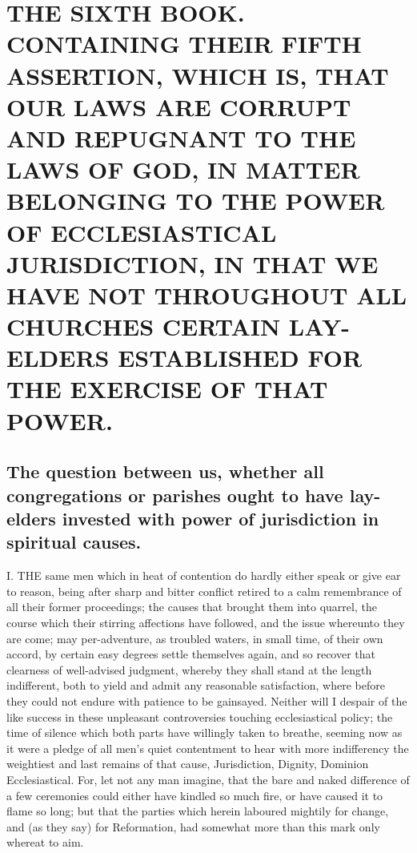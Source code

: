 \chapter*[The Sixth Book]{THE SIXTH BOOK. 
CONTAINING THEIR FIFTH ASSERTION, WHICH IS, THAT OUR LAWS ARE CORRUPT AND REPUGNANT TO THE LAWS OF GOD, IN MATTER BELONGING TO THE POWER OF ECCLESIASTICAL JURISDICTION, IN THAT WE HAVE NOT THROUGHOUT ALL CHURCHES CERTAIN LAY-ELDERS ESTABLISHED FOR THE EXERCISE OF THAT POWER.}
\label{chap:book6}


\section*{The question between us, whether all congregations or parishes ought to have lay-elders invested with power of jurisdiction in spiritual causes.}

I. THE same men which in heat of contention do hardly either speak or give ear to reason, being after sharp and bitter conflict retired to a calm remembrance of all their former proceedings; the causes that brought them into quarrel, the course which their stirring affections have followed, and the issue whereunto they are come;
may per-adventure, as troubled waters, in small time, of their own accord, by certain easy degrees settle themselves again, and so recover that clearness of well-advised judgment, whereby they shall stand at the length indifferent, both to yield and admit any reasonable satisfaction, where before they could not endure with patience to be gainsayed. Neither will I despair of the like success in these unpleasant controversies touching ecclesiastical policy; the time of silence which both parts have willingly taken to breathe, seeming now as it were a pledge of all men’s quiet contentment to hear with more indifferency the weightiest and last remains of that cause, Jurisdiction, Dignity, Dominion Ecclesiastical. For, let not any man imagine, that the bare and naked difference of a few ceremonies could either have kindled so much fire, or have caused it to flame so long; but that the parties which herein laboured mightily for change, and (as they say) for Reformation, had somewhat more than this mark only whereat to aim.

